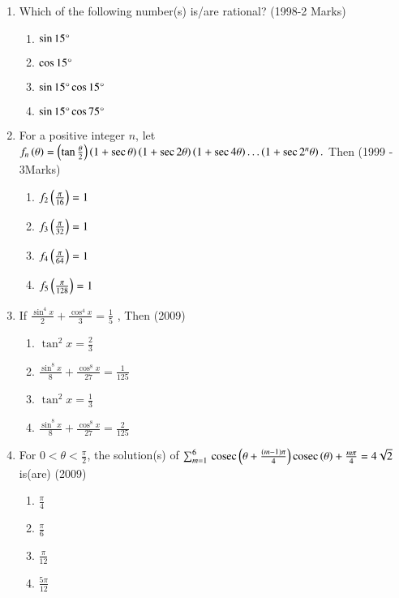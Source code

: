 \documentclass[journal,12pt,onecolumn]{IEEEtran}
\theoremstyle{remark}
\begin{document}
\begin{enumerate}
\item Which of the following number(s) is/are rational? \hfill(1998-2 Marks) 
\begin{enumerate}
    \item $\sin{15}\degree$
    \item $\cos{15}\degree$
    \item $\sin{15}\degree \cos{15}\degree$
    \item $\sin{15}\degree \cos{75}\degree$
\end{enumerate}
\item For a positive integer $n$, let \ 
$f_n\left(\theta\right) = \left(\tan\frac{\theta}{2}\right)\left(1+\sec{\theta}\right)\left(1+\sec{2\theta}\right)\left(1+\sec4\theta\right)\dots\left(1+\sec2^n{\theta}\right).$ Then \hfill(1999 - 3Marks)
\begin{enumerate}
    \item $f_2\left(\frac{\pi}{16}\right) = 1$
    \item $f_3\left(\frac{\pi}{32}\right) = 1$
    \item $f_4\left(\frac{\pi}{64}\right) = 1$
    \item $f_5\left(\frac{\pi}{128}\right) = 1$
\end{enumerate}
\item If $\frac{\sin^4{x}}{2}+\frac{\cos^4{x}}{3}=\frac{1}{5}$ , Then \hfill(2009) 
\begin{enumerate}
    \item $\tan^2{x}=\frac{2}{3}$
    \item $\frac{\sin^8{x}}{8}+\frac{\cos^8{x}}{27}=\frac{1}{125}$
    \item $\tan^2{x}=\frac{1}{3}$
    \item $\frac{\sin^8{x}}{8}+\frac{\cos^8{x}}{27}=\frac{2}{125}$
\end{enumerate}
\item For $ 0<\theta <\frac{\pi}{2}$, the solution(s) of $\sum_{m=1}^{6}\,\text{cosec}\,{\left(\theta+\frac{(m-1)\pi}{4}\right)}\,\text{cosec}\,{{\left(\theta\right)+\frac{m\pi}{4}} }= 4\sqrt{2}$ is(are) \hfill(2009) 
\begin{enumerate}
    \item $\frac{\pi}{4}$
    \item $\frac{\pi}{6}$
    \item $\frac{\pi}{12}$
    \item $\frac{5\pi}{12}$
\end{enumerate}


\end{enumerate}
\end{document}
